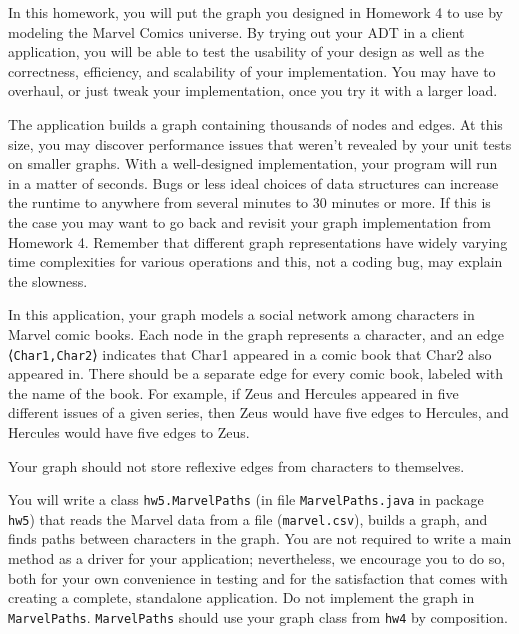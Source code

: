 \documentclass[11pt]{article}
\begin{document}
\noindent In this homework, you will put the graph you designed in Homework 4 to use by modeling the Marvel Comics universe. By trying out your ADT in a client application, you will be able to test the usability of your design as well as the correctness, efficiency, and scalability of your implementation. You may have to overhaul, or just tweak your implementation, once you try it with a larger load.

\noindent The application builds a graph containing thousands of nodes and edges. At this size, you may discover performance issues that weren't revealed by your unit tests on smaller graphs. With a well-designed implementation, your program will run in a matter of seconds. Bugs or less ideal choices of data structures can increase the runtime to anywhere from several minutes to 30 minutes or more. If this is the case you may want to go back and revisit your graph implementation from Homework 4. Remember that different graph representations have widely varying time complexities for various operations and this, not a coding bug, may explain the slowness.

\newpage

\newline

\noindent In this application, your graph models a social network among characters in Marvel comic books. Each node in the graph represents a character, and an edge ⟨\texttt{Char1,Char2}⟩ indicates that Char1 appeared in a comic book that Char2 also appeared in. There should be a separate edge for every comic book, labeled with the name of the book. For example, if Zeus and Hercules appeared in five different issues of a given series, then Zeus would have five edges to Hercules, and Hercules would have five edges to Zeus.

\noindent Your graph should not store reflexive edges from characters to themselves.

\noindent You will write a class \texttt{hw5.MarvelPaths} (in file \texttt{MarvelPaths.java} in package \texttt{hw5}) that reads the Marvel data from a file (\texttt{marvel.csv}), builds a graph, and finds paths between characters in the graph. You are not required to write a main method as a driver for your application; nevertheless, we encourage you to do so, both for your own convenience in testing and for the satisfaction that comes with creating a complete, standalone application. Do not implement the graph in \texttt{MarvelPaths}. \texttt{MarvelPaths} should use your graph class from \texttt{hw4} by composition.
\end{document}
